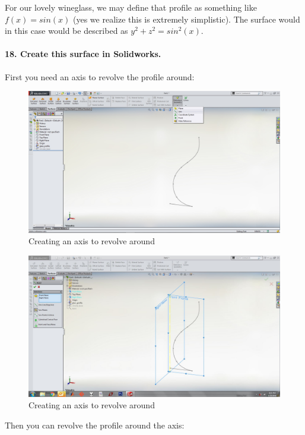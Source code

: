 \documentclass{article}
\begin{document}
For our lovely wineglass, we may define that profile as something like $f(x) = sin(x)$ (yes we realize this is extremely simplistic). The surface would in this case would be described as $y^2 + z^2 = sin^2(x)$.

\paragraph{18. Create this surface in Solidworks.} 

First you need an axis to revolve the profile around:
\begin{figure}[h!]
    \centering
    \includegraphics[width=1\textwidth]{figs_and_code/QEA_axis1}
    \caption{Creating an axis to revolve around}
\end{figure}

\begin{figure}[h!]
    \centering
    \includegraphics[width=1\textwidth]{figs_and_code/QEA_axis2}
    \caption{Creating an axis to revolve around}
\end{figure}

Then you can revolve the profile around the axis:
\end{document}
